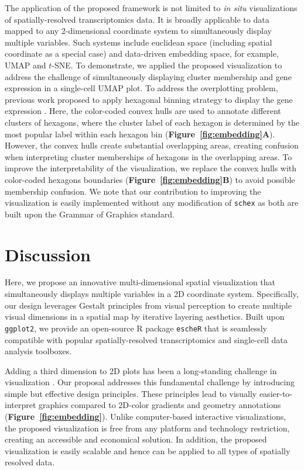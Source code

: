 \documentclass[10pt,twocolumn]{article}
\newcommand{\rr}[1]{{\color{red} #1}}
\begin{document}
The application of the proposed framework is not limited to \textit{in situ} visualizations of spatially-resolved transcriptomics data. It is broadly applicable to data mapped to any 2-dimensional coordinate system to simultaneously display multiple variables. Such systems include euclidean space (including spatial coordinate as a special case) and data-driven embedding space, for example, UMAP and $t$-SNE. To demonstrate, we applied the proposed visualization to address the challenge of simultaneously displaying cluster membership and gene expression in a single-cell UMAP plot. To address the overplotting problem, previous work proposed to apply hexagonal binning strategy to display the gene expression \cite{freytag_2020}. Here, the color-coded convex hulls are used to annotate different clusters of \rr{hexagons, where the cluster label of each hexagon is determined by the most popular label within each hexagon bin} (\textbf{Figure~\ref{fig:embedding}A}). However, the convex hulls create substantial overlapping areas, creating confusion when interpreting cluster memberships of hexagons in the overlapping areas. To improve the interpretability of the visualization, we replace the convex hulls with color-coded hexagons boundaries (\textbf{Figure~\ref{fig:embedding}B}) to avoid possible membership confusion. We note that our contribution to improving the visualization is easily implemented without any modification of \texttt{schex} as both are built upon the Grammar of Graphics \cite{wilkinson_2012} standard.


\section{Discussion}
Here, we propose an innovative multi-dimensional spatial visualization that simultaneously displays multiple variables in a 2D coordinate system. Specifically, our design leverages Gestalt principles from visual perception to create multiple visual dimensions in a spatial map by iterative layering aesthetics. Built upon \texttt{ggplot2}, we provide an open-source R package \texttt{escheR} that is seamlessly compatible with popular spatially-resolved transcriptomics and single-cell data analysis toolboxes. 

Adding a third dimension to 2D plots has been a long-standing challenge in visualization \cite{odonoghue_2010}. Our proposal addresses this fundamental challenge by introducing simple but effective design principles. These principles lead to visually easier-to-interpret graphics compared to 2D-color gradients and geometry annotations (\textbf{Figure~\ref{fig:embedding}}). Unlike computer-based interactive visualizations, the proposed visualization is free from any platform and technology restriction, creating an accessible and economical solution. In addition, the proposed visualization is easily scalable and hence can be applied to all types of spatially resolved data. 
\end{document}
